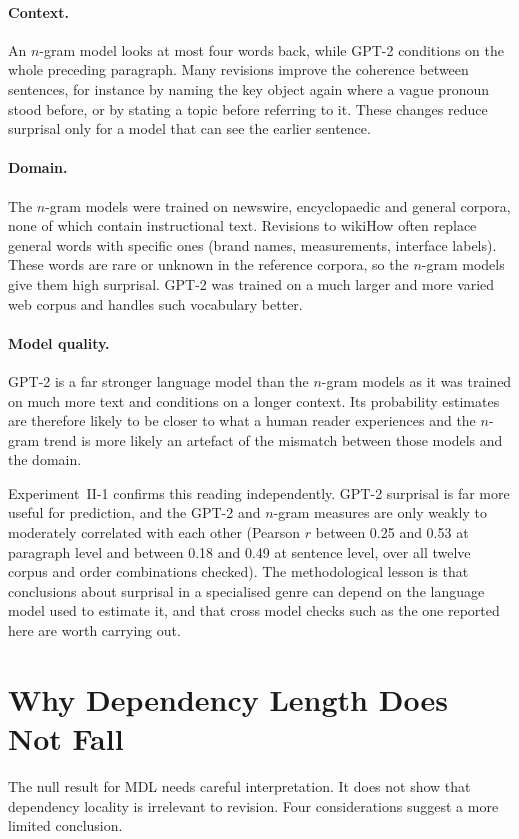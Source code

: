 \documentclass[12pt,a4paper,oneside]{report}
\begin{document}
\paragraph{Context.} An $n$-gram model looks at most four words back, while GPT-2 conditions on the whole preceding paragraph. Many revisions improve the coherence between sentences, for instance by naming the key object again where a vague pronoun stood before, or by stating a topic before referring to it. These changes reduce surprisal only for a model that can see the earlier sentence.

\paragraph{Domain.} The $n$-gram models were trained on newswire, encyclopaedic and general corpora, none of which contain instructional text. Revisions to wikiHow often replace general words with specific ones (brand names, measurements, interface labels). These words are rare or unknown in the reference corpora, so the $n$-gram models give them high surprisal. GPT-2 was trained on a much larger and more varied web corpus and handles such vocabulary better.

\paragraph{Model quality.} GPT-2 is a far stronger language model than the $n$-gram models as it was trained on much more text and conditions on a longer context. Its probability estimates are therefore likely to be closer to what a human reader experiences and the $n$-gram trend is more likely an artefact of the mismatch between those models and the domain.

Experiment~II-1 confirms this reading independently. GPT-2 surprisal is far more useful for prediction, and the GPT-2 and $n$-gram measures are only weakly to moderately correlated with each other (Pearson $r$ between 0.25 and 0.53 at paragraph level and between 0.18 and 0.49 at sentence level, over all twelve corpus and order combinations checked). The methodological lesson is that conclusions about surprisal in a specialised genre can depend on the language model used to estimate it, and that cross model checks such as the one reported here are worth carrying out.

\section{Why Dependency Length Does Not Fall}
The null result for MDL needs careful interpretation. It does not show that dependency locality is irrelevant to revision. Four considerations suggest a more limited conclusion.
\end{document}

